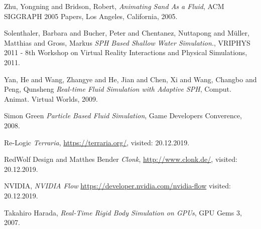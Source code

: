 \documentclass[a4paper]{article}
\begin{document}
\renewcommand{\refname}{\section{References and Further Sources}}
\begin{thebibliography}{1}
  
    Zhu, Yongning and Bridson, Robert,
    \emph{Animating Sand As a Fluid},
    ACM SIGGRAPH 2005 Papers, 
    Los Angeles, California,
    2005.
    
    Solenthaler, Barbara and Bucher, Peter and Chentanez, Nuttapong and Müller, Matthias and Gross, Markus
    \emph{SPH Based Shallow Water Simulation.},
    VRIPHYS 2011 - 8th Workshop on Virtual Reality Interactions and Physical Simulations, 
    2011.
    
    Yan, He and Wang, Zhangye and He, Jian and Chen, Xi and Wang, Changbo and Peng, Qunsheng
    \emph{Real-time Fluid Simulation with Adaptive SPH},
    Comput. Animat. Virtual Worlds, 
    2009.   
    
    Simon Green
    \emph{Particle Based Fluid Simulation},
    Game Developers Converence, 
    2008.    
    
    Re-Logic
    \emph{Terraria},
    \url{https://terraria.org/}, 
    visited: 20.12.2019.  
    
    RedWolf Design and Matthes Bender
    \emph{Clonk},
    \url{http://www.clonk.de/}, 
    visited: 20.12.2019. 
    
    NVIDIA,
    \emph{NVIDIA Flow}
    \url{https://developer.nvidia.com/nvidia-flow}
    visited: 20.12.2019. 
    
    Takahiro Harada,
    \emph{Real-Time Rigid Body Simulation on GPUs},
    GPU Gems 3,
    2007.
    
\end{thebibliography}
\end{document}
